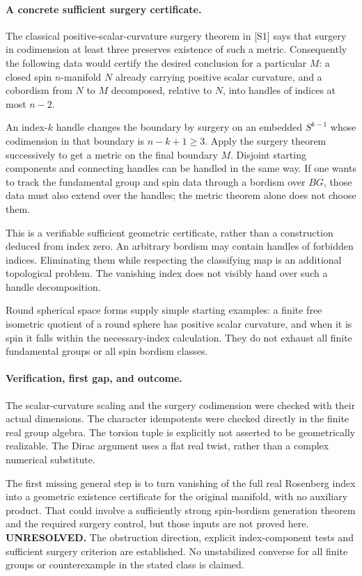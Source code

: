\documentclass[11pt]{article}
\begin{document}
\paragraph{A concrete sufficient surgery certificate.}
The classical positive-scalar-curvature surgery
theorem in [S1] says that surgery in codimension
at least three preserves existence of such
a metric. Consequently the following data
would certify the desired conclusion for
a particular $M$: a closed spin $n$-manifold
$N$ already carrying positive scalar curvature,
and a cobordism from $N$ to $M$ decomposed,
relative to $N$, into handles of indices
at most $n-2$.

An index-$k$ handle changes the boundary by
surgery on an embedded $S^{k-1}$ whose
codimension in that boundary is
$n-k+1\geq3$. Apply the surgery theorem
successively to get a metric on the final
boundary $M$. Disjoint starting components
and connecting handles can be handled in
the same way. If one wants to track the
fundamental group and spin data through
a bordism over $BG$, those data must also
extend over the handles; the metric theorem
alone does not choose them.

This is a verifiable sufficient geometric
certificate, rather than a construction
deduced from index zero. An arbitrary
bordism may contain handles of forbidden
indices. Eliminating them while respecting
the classifying map is an additional
topological problem. The vanishing index
does not visibly hand over such a handle
decomposition.

Round spherical space forms supply simple
starting examples: a finite free isometric
quotient of a round sphere has positive
scalar curvature, and when it is spin it
falls within the necessary-index calculation.
They do not exhaust all finite fundamental
groups or all spin bordism classes.

\paragraph{Verification, first gap, and outcome.}
The scalar-curvature scaling and the surgery
codimension were checked with their actual
dimensions. The character idempotents were
checked directly in the finite real group
algebra. The torsion tuple is explicitly
not asserted to be geometrically realizable.
The Dirac argument uses a flat real twist,
rather than a complex numerical substitute.

The first missing general step is to turn
vanishing of the full real Rosenberg index
into a geometric existence certificate for
the original manifold, with no auxiliary
product. That could involve a sufficiently
strong spin-bordism generation theorem and
the required surgery control, but those
inputs are not proved here.
\textbf{UNRESOLVED.} The obstruction direction,
explicit index-component tests and sufficient
surgery criterion are established. No
unstabilized converse for all finite groups
or counterexample in the stated class is
claimed.
\end{document}
